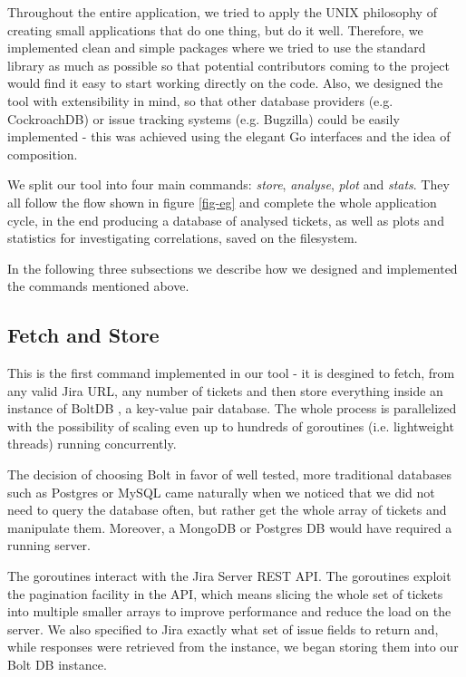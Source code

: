 \documentclass{mpaper}
\begin{document}
Throughout the entire application, we tried to apply the UNIX philosophy of creating small applications that do one thing, but 
do it well. Therefore, we implemented clean and simple packages where we tried to use the standard library as much as possible
so that potential contributors coming to the project would find it easy to start working directly on the code. Also, we designed 
the tool with extensibility in mind, so that other database providers (e.g. CockroachDB) or issue tracking systems (e.g. Bugzilla) 
could be easily implemented - this was achieved using the elegant Go interfaces and the idea of composition.  

We split our tool into four main commands: \emph{store}, \emph{analyse}, \emph{plot} and \emph{stats}. They all 
follow the flow shown in figure \ref{fig-eg} and complete the whole application cycle, in the end producing a database 
of analysed tickets, as well as plots and statistics for investigating correlations, saved on the filesystem.

In the following three subsections we describe how we designed and implemented the commands mentioned above.

\subsection{Fetch and Store}

This is the first command implemented in our tool - it is desgined to fetch, from any valid Jira URL, any number of tickets 
and then store everything inside an instance of BoltDB \cite{bolt}, a key-value pair 
database. The whole process is parallelized with the possibility of scaling even up to hundreds of goroutines
(i.e. lightweight threads) running concurrently. 

The decision of choosing Bolt in favor of well tested, more traditional databases such as Postgres or MySQL came naturally when 
we noticed that we did not need to query the database often, but rather get the whole array of tickets and manipulate them. Moreover, 
a MongoDB or Postgres DB would have required a running server. 

The goroutines interact with the Jira Server REST API. The goroutines exploit the pagination facility in the API, which means 
slicing the whole set of tickets into multiple smaller arrays to improve performance and reduce the load on the server. We also
specified to Jira exactly what set of issue fields to return and, while responses were retrieved from the instance,
we began storing them into our Bolt DB instance. 
\end{document}
